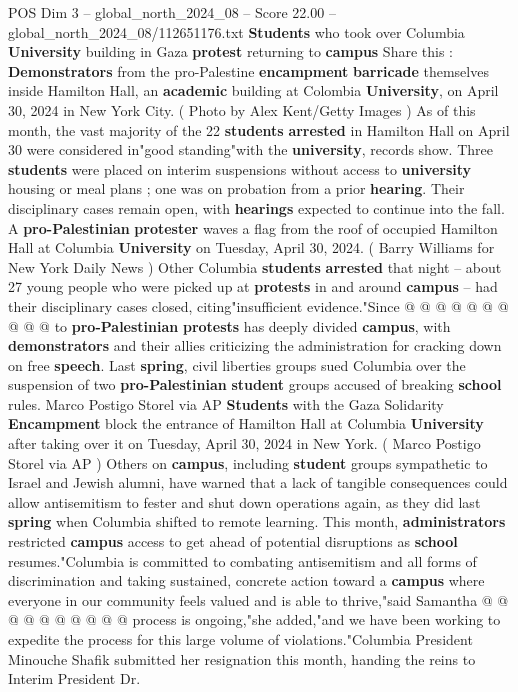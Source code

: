 \begin{textsample}{POS Dim 3 – global\_north\_2024\_08 – Score 22.00 – global\_north\_2024\_08/112651176.txt}  \label{ex:f3_pos_137}
\textbf{Students} who took over Columbia \textbf{University} building in Gaza \textbf{protest} returning to \textbf{campus} Share this : \textbf{Demonstrators} from the pro-Palestine \textbf{encampment} \textbf{barricade} themselves inside Hamilton Hall, an \textbf{academic} building at Colombia \textbf{University}, on April 30, 2024 in New York City. ( Photo by Alex Kent/Getty Images ) As of this month, the vast majority of the 22 \textbf{students} \textbf{arrested} in Hamilton Hall on April 30 were considered in"good standing"with the \textbf{university}, records show.
Three \textbf{students} were placed on interim suspensions without access to \textbf{university} housing or meal plans ; one was on probation from a prior \textbf{hearing}.
Their disciplinary cases remain open, with \textbf{hearings} expected to continue into the fall.
A \textbf{pro-Palestinian} \textbf{protester} waves a flag from the roof of occupied Hamilton Hall at Columbia \textbf{University} on Tuesday, April 30, 2024. ( Barry Williams for New York Daily News ) Other Columbia \textbf{students} \textbf{arrested} that night -- about 27 young people who were picked up at \textbf{protests} in and around \textbf{campus} -- had their disciplinary cases closed, citing"insufficient evidence."Since @ @ @ @ @ @ @ @ @ @ to \textbf{pro-Palestinian} \textbf{protests} has deeply divided \textbf{campus}, with \textbf{demonstrators} and their allies criticizing the administration for cracking down on free \textbf{speech}.
Last \textbf{spring}, civil liberties groups sued Columbia over the suspension of two \textbf{pro-Palestinian} \textbf{student} groups accused of breaking \textbf{school} rules.
Marco Postigo Storel via AP \textbf{Students} with the Gaza Solidarity \textbf{Encampment} block the entrance of Hamilton Hall at Columbia \textbf{University} after taking over it on Tuesday, April 30, 2024 in New York. ( Marco Postigo Storel via AP ) Others on \textbf{campus}, including \textbf{student} groups sympathetic to Israel and Jewish alumni, have warned that a lack of tangible consequences could allow antisemitism to fester and shut down operations again, as they did last \textbf{spring} when Columbia shifted to remote learning.
This month, \textbf{administrators} restricted \textbf{campus} access to get ahead of potential disruptions as \textbf{school} resumes."Columbia is committed to combating antisemitism and all forms of discrimination and taking sustained, concrete action toward a \textbf{campus} where everyone in our community feels valued and is able to thrive,"said Samantha @ @ @ @ @ @ @ @ @ @ process is ongoing,"she added,"and we have been working to expedite the process for this large volume of violations."Columbia President Minouche Shafik submitted her resignation this month, handing the reins to Interim President Dr.

\end{textsample}
